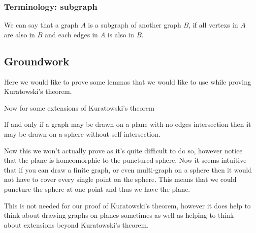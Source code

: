 \documentclass{article}
\begin{document}
\subsubsection{Terminology: subgraph}
We can say that a \gls{graph} $A$ is a \gls{subgraph} of another \gls{graph} $B$, if all \glspl{vertex} in $A$ are also in $B$ and each \glspl{edge} in $A$ is also in $B$.

\subsection{Groundwork}
Here we would like to prove some lemmas that we would like to use while proving Kuratowski's theorem.

Now for some extensions of Kuratowski's theorem 

\begin{theorem} \label{sphere=plane}
	If and only if a \gls{graph} may be drawn on a plane with no \glspl{edge} intersection then it may be drawn on a sphere without self intersection.
\end{theorem}

Now this we won't actually prove as it's quite difficult to do so, however notice that the plane is homeomorphic to the punctured sphere. Now it seems intuitive that if you can draw a finite graph, or even multi-graph on a sphere then it would not have to cover every single point on the sphere. This means that we could puncture the sphere at one point and thus we have the plane.

This is not needed for our proof of Kuratowski's theorem, however it does help to think about drawing graphs on planes sometimes as well as helping to think about extensions beyond Kuratowski's theorem.



\printnoidxglossary



\end{document}
